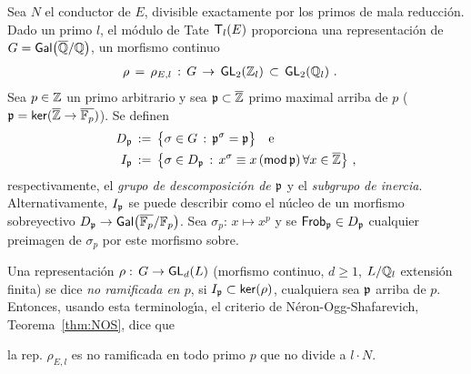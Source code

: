 Sea $N$ el conductor de $E$, divisible exactamente por los primos de mala
reducci\'{o}n. Dado un primo $l$, el m\'{o}dulo de Tate $\tate[l](E)$
proporciona una representaci\'{o}n de
\begin{math}
	G=\galois{\clos{\bb Q}/\bb Q}
\end{math}, un morfismo continuo
\begin{align*}
	\rho & \,=\,\rho_{E,l} \,:\,G\,\rightarrow\,\GL[2](\bb Z_l)\,\subset\,
		\GL[2](\bb Q_l)
	\text{ .}
\end{align*}
%
Sea $p\in\bb Z$ un primo arbitrario y sea $\frak p\subset\clos{\bb Z}$ primo
maximal arriba de $p$ ($\frak p=\ker(\clos{\bb Z}\rightarrow\clos{\bb F_p})$).
Se definen
\begin{align*}
	\descomp[\frak p] & \,:=\,\big\{\sigma\in G\,:\,
		\frak p^\sigma=\frak p\big\} \quad\text{e} \\
	\inercia[\frak p] & \,:=\,\big\{\sigma\in D_{\frak p}\,:\,
		x^\sigma \equiv x\,(\modulo\,\frak p)\,\forall x\in\clos{\bb Z}
		\big\}
	\text{ ,}
\end{align*}
%
respectivamente, el \emph{grupo de descomposici\'{o}n de $\frak p$} y el
\emph{subgrupo de inercia}. Alternativamente, $\inercia[\frak p]$ se puede
describir como el n\'{u}cleo de un morfismo sobreyectivo
\begin{math}
	\descomp[\frak p]\rightarrow\galois{\clos{\bb F_p}/\bb F_p}
\end{math}. Sea $\sigma_p:\,x\mapsto x^p$ y se
$\frob[\frak p]\in\descomp[\frak p]$ cualquier preimagen de $\sigma_p$ por este
morfismo sobre.

Una representaci\'{o}n $\rho:\,G\rightarrow\GL[d](L)$ (morfismo continuo,
$d\geq 1$, $L/\bb Q_l$ extensi\'{o}n finita) se dice \emph{no ramificada en %
$p$}, si $\inercia[\frak p]\subset\ker(\rho)$, cualquiera sea $\frak p$ arriba
de $p$. Entonces, usando esta terminolog\'{\i}a, el criterio de
N\'{e}ron-Ogg-Shafarevich, Teorema~\ref{thm:NOS}, dice que

\begin{teoNOS}\label{thm:NOSbis}
	la rep. $\rho_{E,l}$ es no ramificada en todo primo $p$
	que no divide a $l\cdot N$.
\end{teoNOS}
